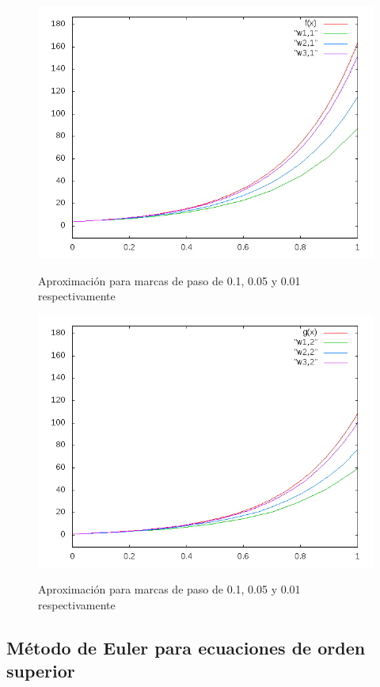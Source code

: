 \documentclass[12pt]{article}       %
\begin{document}
    \begin{figure}[H]
    	\centering
    	\includegraphics[scale=0.65]{img/grafica2.png}
    	\label{figura1}
    	\caption{Aproximación para marcas de paso de 0.1, 0.05 y 0.01 respectivamente} 
    \end{figure}
    
    \begin{figure}[H]
    	\centering
    	\includegraphics[scale=0.65]{img/grafica3.png}
    	\label{figura1}
    	\caption{Aproximación para marcas de paso de 0.1, 0.05 y 0.01 respectivamente} 
    \end{figure}


\subsection{Método de Euler para ecuaciones de orden superior}
 
\end{document}
